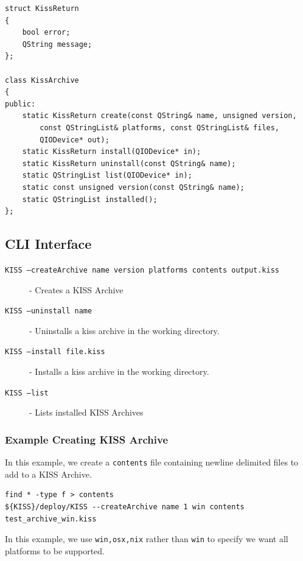 \documentclass[7pt,letterpaper]{article}
\newcommand{\code}[1]{\texttt{#1}}
\begin{document}
	\begin{lstlisting}
struct KissReturn 
{
	bool error;
	QString message;
};

class KissArchive 
{
public:
	static KissReturn create(const QString& name, unsigned version, 
		const QStringList& platforms, const QStringList& files, 
		QIODevice* out);
	static KissReturn install(QIODevice* in);
	static KissReturn uninstall(const QString& name);
	static QStringList list(QIODevice* in);
	static const unsigned version(const QString& name);
	static QStringList installed();
};
	\end{lstlisting}
	\vspace{.25in}
	
	\subsection{CLI Interface}
	
	\begin{description}
	\item[\code{KISS --createArchive name version platforms contents output.kiss}] - Creates a KISS Archive
	\item[\code{KISS --uninstall name}] - Uninstalls a kiss archive in the working directory.
	\item[\code{KISS --install file.kiss}] - Installs a kiss archive in the working directory.
	\item[\code{KISS --list}] - Lists installed KISS Archives
	\end{description}
	\singlespacing
	
	\subsubsection{Example Creating KISS Archive}
	In this example, we create a \code{contents} file containing newline delimited files to add to a KISS Archive.
	
	\begin{lstlisting}
find * -type f > contents
${KISS}/deploy/KISS --createArchive name 1 win contents test_archive_win.kiss
	\end{lstlisting}
	\vspace{.25in}
	In this example, we use \code{win,osx,nix} rather than \code{win} to specify we want all platforms to be supported.
	
\end{document}
